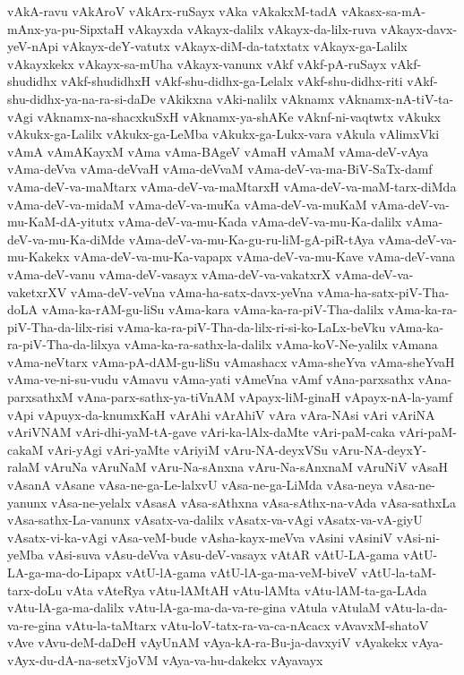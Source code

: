 {vAkA-ravu
vAkAroV
vAkArx-ruSayx
vAka
vAkakxM-tadA
vAkasx-sa-mA-mAnx-ya-pu-SipxtaH
vAkayxda
vAkayx-dalilx
vAkayx-da-lilx-ruva
vAkayx-davx-yeV-nApi
vAkayx-deY-vatutx
vAkayx-diM-da-tatxtatx
vAkayx-ga-Lalilx
vAkayxkekx
vAkayx-sa-mUha
vAkayx-vanunx
vAkf
vAkf-pA-ruSayx
vAkf-shudidhx
vAkf-shudidhxH
vAkf-shu-didhx-ga-Lelalx
vAkf-shu-didhx-riti
vAkf-shu-didhx-ya-na-ra-si-daDe
vAkikxna
vAki-nalilx
vAknamx
vAknamx-nA-tiV-ta-vAgi
vAknamx-na-shacxkuSxH
vAknamx-ya-shAKe
vAknf-ni-vaqtwtx
vAkukx
vAkukx-ga-Lalilx
vAkukx-ga-LeMba
vAkukx-ga-Lukx-vara
vAkula
vAlimxVki
vAmA
vAmAKayxM
vAma
vAma-BAgeV
vAmaH
vAmaM
vAma-deV-vAya
vAma-deVva
vAma-deVvaH
vAma-deVvaM
vAma-deV-va-ma-BiV-SaTx-damf
vAma-deV-va-maMtarx
vAma-deV-va-maMtarxH
vAma-deV-va-maM-tarx-diMda
vAma-deV-va-midaM
vAma-deV-va-muKa
vAma-deV-va-muKaM
vAma-deV-va-mu-KaM-dA-yitutx
vAma-deV-va-mu-Kada
vAma-deV-va-mu-Ka-dalilx
vAma-deV-va-mu-Ka-diMde
vAma-deV-va-mu-Ka-gu-ru-liM-gA-piR-tAya
vAma-deV-va-mu-Kakekx
vAma-deV-va-mu-Ka-vapapx
vAma-deV-va-mu-Kave
vAma-deV-vana
vAma-deV-vanu
vAma-deV-vasayx
vAma-deV-va-vakatxrX
vAma-deV-va-vaketxrXV
vAma-deV-veVna
vAma-ha-satx-davx-yeVna
vAma-ha-satx-piV-Tha-doLA
vAma-ka-rAM-gu-liSu
vAma-kara
vAma-ka-ra-piV-Tha-dalilx
vAma-ka-ra-piV-Tha-da-lilx-risi
vAma-ka-ra-piV-Tha-da-lilx-ri-si-ko-LaLx-beVku
vAma-ka-ra-piV-Tha-da-lilxya
vAma-ka-ra-sathx-la-dalilx
vAma-koV-Ne-yalilx
vAmana
vAma-neVtarx
vAma-pA-dAM-gu-liSu
vAmashacx
vAma-sheYva
vAma-sheYvaH
vAma-ve-ni-su-vudu
vAmavu
vAma-yati
vAmeVna
vAmf
vAna-parxsathx
vAna-parxsathxM
vAna-parx-sathx-ya-tiVnAM
vApayx-liM-ginaH
vApayx-nA-la-yamf
vApi
vApuyx-da-knumxKaH
vArAhi
vArAhiV
vAra
vAra-NAsi
vAri
vAriNA
vAriVNAM
vAri-dhi-yaM-tA-gave
vAri-ka-lAlx-daMte
vAri-paM-caka
vAri-paM-cakaM
vAri-yAgi
vAri-yaMte
vAriyiM
vAru-NA-deyxVSu
vAru-NA-deyxY-ralaM
vAruNa
vAruNaM
vAru-Na-sAnxna
vAru-Na-sAnxnaM
vAruNiV
vAsaH
vAsanA
vAsane
vAsa-ne-ga-Le-lalxvU
vAsa-ne-ga-LiMda
vAsa-neya
vAsa-ne-yanunx
vAsa-ne-yelalx
vAsasA
vAsa-sAthxna
vAsa-sAthx-na-vAda
vAsa-sathxLa
vAsa-sathx-La-vanunx
vAsatx-va-dalilx
vAsatx-va-vAgi
vAsatx-va-vA-giyU
vAsatx-vi-ka-vAgi
vAsa-veM-bude
vAsha-kayx-meVva
vAsini
vAsiniV
vAsi-ni-yeMba
vAsi-suva
vAsu-deVva
vAsu-deV-vasayx
vAtAR
vAtU-LA-gama
vAtU-LA-ga-ma-do-Lipapx
vAtU-lA-gama
vAtU-lA-ga-ma-veM-biveV
vAtU-la-taM-tarx-doLu
vAta
vAteRya
vAtu-lAMtAH
vAtu-lAMta
vAtu-lAM-ta-ga-LAda
vAtu-lA-ga-ma-dalilx
vAtu-lA-ga-ma-da-va-re-gina
vAtula
vAtulaM
vAtu-la-da-va-re-gina
vAtu-la-taMtarx
vAtu-loV-tatx-ra-va-ca-nAcacx
vAvavxM-shatoV
vAve
vAvu-deM-daDeH
vAyUnAM
vAya-kA-ra-Bu-ja-davxyiV
vAyakekx
vAya-vAyx-du-dA-na-setxVjoVM
vAya-va-hu-dakekx
vAyavayx
}
